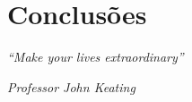 \chapter{Conclusões}
\label{Capítulo6}

\begin{center}
    \textit{``Make your lives extraordinary''}
    
    \textit{Professor John Keating}

\end{center}